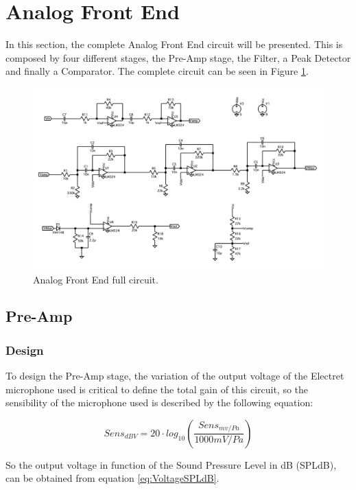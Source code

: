 \section{Analog Front End}

In this section, the complete Analog Front End circuit will be presented. This is composed by four different stages, the Pre-Amp stage, the Filter, a Peak Detector and finally a Comparator. The complete circuit can be seen in Figure \ref{fig:CompleteAFE}.

\begin{figure}[H]
    \centering
    \includegraphics*[scale = 0.45]{Images/CompleteAFE.png}
    \caption{Analog Front End full circuit.}
    \label{fig:CompleteAFE}
\end{figure}

\subsection{Pre-Amp}

\subsubsection{Design}

To design the Pre-Amp stage, the variation of the output voltage of the Electret microphone used is critical to define the total gain of this circuit, so the sensibility of the microphone used is described by the following equation:

\begin{equation}
    Sens_{dBV} = 20 \cdot log_{10} (\frac{Sens_{mv/Pa}}{1000mV/Pa})
    \label{eq:SensdBV}
\end{equation}

So the output voltage in function of the Sound Pressure Level in dB (SPLdB), can be obtained from equation \ref{eq:VoltageSPLdB}.

